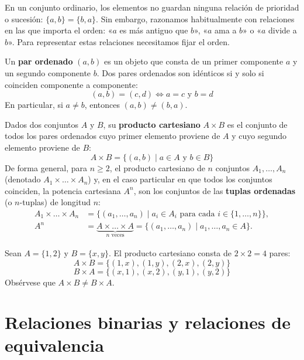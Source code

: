 En un conjunto ordinario, los elementos no guardan ninguna relación de
prioridad o sucesión: $\{a, b\} = \{b, a\}$. Sin embargo, razonamos
habitualmente con relaciones en las que importa el orden: «$a$ es más antiguo que $b$», «$a$ ama a $b$» o «$a$ divide a $b$». Para representar estas relaciones necesitamos fijar el orden.

\begin{definicion}
Un \textbf{par ordenado} $(a, b)$ es un objeto que consta de un primer componente $a$ y un segundo componente $b$. Dos pares ordenados son idénticos si y solo si coinciden componente a componente:
\[
(a, b) = (c, d) \iff a = c \text{ y } b = d
\]
En particular, si $a \neq b$, entonces $(a, b) \neq (b, a)$.
\end{definicion}

\begin{definicion}
Dados dos conjuntos $A$ y $B$, su \textbf{producto cartesiano} $A \times B$ es el conjunto de todos los pares ordenados cuyo primer elemento proviene de $A$ y cuyo segundo elemento proviene de $B$:
\[
A \times B = \{(a, b) \mid a \in A \text{ y } b \in B\}
\]
De forma general, para $n \ge 2$, el producto cartesiano de $n$ conjuntos $A_1, \dots, A_n$ (denotado $A_1 \times \dots \times A_n$) y, en el caso particular en que todos los conjuntos coinciden, la potencia cartesiana $A^n$, son los conjuntos de las \textbf{tuplas ordenadas} (o $n$-tuplas) de longitud $n$:
\begin{align*}
  A_1 \times \dots \times A_n &= \{(a_1, \dots, a_n) \mid a_i \in A_i \text{ para cada } i \in \{1, \dots, n\}\}, \\
  A^n &= \underbrace{A \times \dots \times A}_{n \text{ veces}} = \{(a_1, \dots, a_n) \mid a_1, \dots, a_n \in A\}.
\end{align*}
\end{definicion}

\begin{ejemplo}
Sean $A = \{1, 2\}$ y $B = \{x, y\}$. El producto cartesiano consta de $2 \times 2 = 4$ pares:
\[
A \times B = \{(1, x), (1, y), (2, x), (2, y)\}
\]
\[
B \times A = \{(x, 1), (x, 2), (y, 1), (y, 2)\}
\]
Obsérvese que $A \times B \neq B \times A$.
\end{ejemplo}

\section{Relaciones binarias y relaciones de equivalencia}

